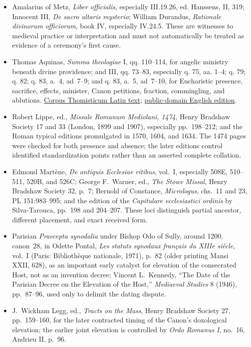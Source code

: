\begin{itemize}
  \item Amalarius of Metz, \emph{Liber officialis}, especially III.19.26, ed. Hanssens, II, 319; Innocent III, \emph{De sacro altaris mysterio}; William Durandus, \emph{Rationale divinorum officiorum}, book IV, especially IV.24.5. These are witnesses to medieval practice or interpretation and must not automatically be treated as evidence of a ceremony's first cause.
  \item Thomas Aquinas, \emph{Summa theologiae} I, qq. 110--114, for angelic ministry beneath divine providence; and III, qq. 73--83, especially q. 75, aa. 1--4; q. 79; q. 82; q. 83, a.~4, ad~7--9; and q. 83, a.~5, ad~7--10, for Eucharistic presence, sacrifice, effects, minister, Canon petitions, fraction, commingling, and ablutions. \href{https://www.corpusthomisticum.org/sth4083.html}{Corpus Thomisticum Latin text}; \href{https://www.newadvent.org/summa/4083.htm}{public-domain English edition}.
  \item Robert Lippe, ed., \emph{Missale Romanum Mediolani, 1474}, Henry Bradshaw Society 17 and 33 (London, 1899 and 1907), especially pp.~198--212; and the Roman typical editions promulgated in 1570, 1604, and 1634. The 1474 pages were checked for both presence and absence; the later editions control identified standardization points rather than an asserted complete collation.
  \item Edmond Martène, \emph{De antiquis Ecclesiae ritibus}, vol.~I, especially 508E, 510--511, 520B, and 526C; George F.~Warner, ed., \emph{The Stowe Missal}, Henry Bradshaw Society 32, p.~7; Bernold of Constance, \emph{Micrologus}, chs.~11 and 23, PL 151:983--995; and the edition of the \emph{Capitulare ecclesiastici ordinis} by Silva-Tarouca, pp.~198 and 204--207. These loci distinguish partial ancestor, different placement, and exact received form.
  \item Parisian \emph{Praecepta synodalia} under Bishop Odo of Sully, around 1200, canon~28, in Odette Pontal, \emph{Les statuts synodaux français du XIIIe siècle}, vol.~I (Paris: Biblioth\`eque nationale, 1971), p.~82 (older printing Mansi XXII, 628), as an important early catalyst for elevation of the consecrated Host, not as an invention decree; Vincent L.~Kennedy, ``The Date of the Parisian Decree on the Elevation of the Host,'' \emph{Mediaeval Studies} 8 (1946), pp.~87--96, used only to delimit the dating dispute.
  \item J.~Wickham Legg, ed., \emph{Tracts on the Mass}, Henry Bradshaw Society 27, pp.~159--160, for the later contracted timing of the Canon's doxological elevation; the earlier joint elevation is controlled by \emph{Ordo Romanus I}, no.~16, Andrieu II, p.~96.

\end{itemize}
